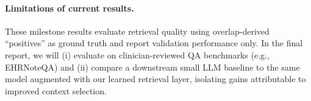 %
%

\paragraph{Limitations of current results.}
These milestone results evaluate retrieval quality using overlap-derived ``positives'' as ground truth and report validation performance only. In the final report, we will (i) evaluate on clinician-reviewed QA benchmarks (e.g., EHRNoteQA) and (ii) compare a downstream small LLM baseline to the same model augmented with our learned retrieval layer, isolating gains attributable to improved context selection.